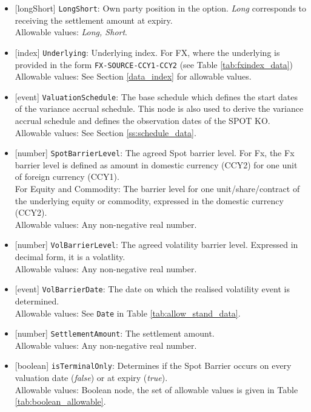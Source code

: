 \begin{itemize}
  \item{}[longShort] \lstinline!LongShort!: Own party position in the option. \emph{Long} corresponds to receiving the settlement amount at expiry. \\
  Allowable values: \emph{Long, Short}.
  \item{}[index] \lstinline!Underlying!: Underlying index. For FX, where the underlying is provided in the form \lstinline!FX-SOURCE-CCY1-CCY2! (see Table \ref{tab:fxindex_data})\\
  Allowable values: See Section \ref{data_index} for allowable values.
  \item{}[event] \lstinline!ValuationSchedule!: The base schedule which defines the start dates of the variance accrual schedule. This node is also used to derive the variance accrual schedule and defines the observation dates of the SPOT KO. \\
  Allowable values: See Section \ref{ss:schedule_data}.
  \item{}[number] \lstinline!SpotBarrierLevel!: The agreed Spot barrier level. For Fx, the Fx barrier level is defined as amount in domestic currency (CCY2) for one unit of foreign currency (CCY1). \\
  For Equity and Commodity: The barrier level for one unit/share/contract of the underlying equity or commodity, expressed in the domestic currency (CCY2).\\
  Allowable values: Any non-negative real number.
  \item{}[number] \lstinline!VolBarrierLevel!: The agreed volatility barrier level. Expressed in decimal form, it is a volatlity.\\
  Allowable values: Any non-negative real number.
  \item{}[event] \lstinline!VolBarrierDate!: The date on which the realised volatility event is determined. \\
  Allowable values: See \lstinline!Date! in Table \ref{tab:allow_stand_data}.
  \item{}[number] \lstinline!SettlementAmount!: The settlement amount. \\
  Allowable values: Any non-negative real number.
  \item{}[boolean] \lstinline!isTerminalOnly!: Determines if the Spot Barrier occurs on every valuation date (\emph{false}) or at expiry (\emph{true}). \\
  Allowable values: Boolean node, the set of allowable values is given in Table \ref{tab:boolean_allowable}.

\end{itemize}
